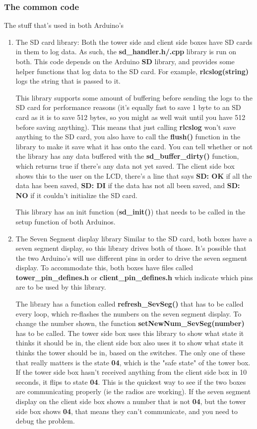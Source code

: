 \documentclass[11pt]{article}
\begin{document}
\subsubsection{The common code}
\label{sec:org318fb9c}
The stuff that's used in both Arduino's
\begin{enumerate}
\item The SD card library:
\label{sec:org5e1f1b2}
Both the tower side and client side boxes have SD cards in them to log data. As
such, the \textbf{sd\_handler.h/.cpp} library is run on both. This code depends on the
Arduino \textbf{SD} library, and provides some helper functions that log data to the SD
card. For example, \textbf{rlcslog(string)} logs the string that is passed to it.

This library supports some amount of buffering before sending the logs to the SD
card for performance reasons (it's equally fast to save 1 byte to an SD card as
it is to save 512 bytes, so you might as well wait until you have 512 before
saving anything). This means that just calling \textbf{rlcslog} won't save anything to
the SD card, you also have to call the \textbf{flush()} function in the library to make
it save what it has onto the card. You can tell whether or not the library has
any data buffered with the \textbf{sd\_buffer\_dirty()} function, which returns true if
there's any data not yet saved. The client side box shows this to the user on
the LCD, there's a line that says \textbf{SD: OK} if all the data has been saved, \textbf{SD:
DI} if the data has not all been saved, and \textbf{SD: NO} if it couldn't initialize
the SD card.

This library has an init function (\textbf{sd\_init()}) that needs to be called in the
setup function of both Arduinos.

\item The Seven Segment display library
\label{sec:orgde1cf61}
Similar to the SD card, both boxes have a seven segment display, so this library
drives both of those. It's possible that the two Arduino's will use different
pins in order to drive the seven segment display. To accommodate this, both boxes
have files called \textbf{tower\_pin\_defines.h} or \textbf{client\_pin\_defines.h} which indicate
which pins are to be used by this library.

The library has a function called \textbf{refresh\_SevSeg()} that has to be called every
loop, which re-flashes the numbers on the seven segment display. To change the
number shown, the function \textbf{setNewNum\_SevSeg(number)} has to be called. The
tower side box uses this library to show what state it thinks it should be in,
the client side box also uses it to show what state it thinks the tower should
be in, based on the switches. The only one of these that really matters is the
state \textbf{04}, which is the "safe state" of the tower box. If the tower side box
hasn't received anything from the client side box in 10 seconds, it flips to
state \textbf{04}. This is the quickest way to see if the two boxes are communicating
properly (ie the radios are working). If the seven segment display on the client
side box shows a number that is not \textbf{04}, but the tower side box shows \textbf{04},
that means they can't communicate, and you need to debug the problem.


\end{enumerate}
\end{document}
